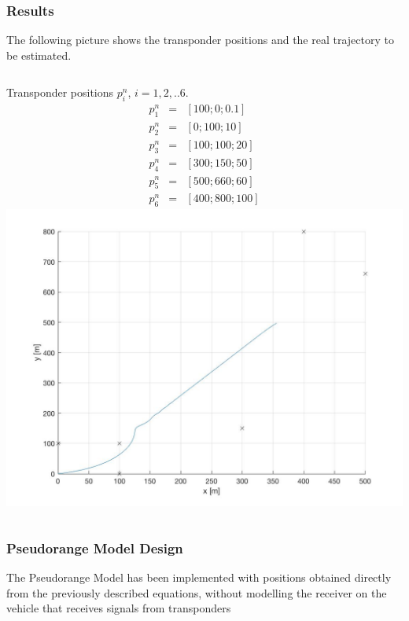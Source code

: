\documentclass{beamer}
\begin{document}
 \begin{frame}
        \frametitle{Results}
        The following picture shows the transponder positions
        and the real trajectory to be estimated.
        
        \begin{columns}
        Transponder positions $p_i^n$, $i=1,2,.. 6$.
        $$
        \begin{matrix}
            p_1^n& =& [100;0;0.1] \\
            p_2^n& =& [0;100;10] \\
            p_3^n &=& [100;100;20] \\
            p_4^n &=& [300;150;50] \\
            p_5^n &=& [500;660;60] \\
            p_6^n &=& [400;800;100]
        \end{matrix}
        $$
			\includegraphics[scale=0.15]{true_traj.jpg}
		\end{columns}
        
    \end{frame}


    
    \begin{frame}
        \frametitle{Pseudorange Model Design}
        The Pseudorange Model has been implemented 
        with positions obtained directly from the 
        previously described equations,
        without modelling the receiver on the vehicle that
        receives signals from transponders
    \end{frame}
\end{document}
